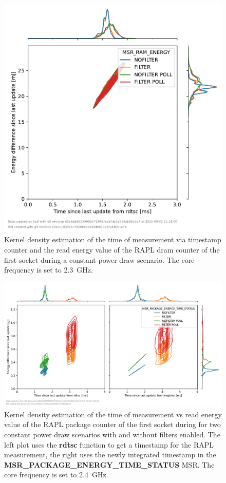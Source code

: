 \begin{figure}[]
    \centering
    \includegraphics[width=0.54\columnwidth]{fig/rapl-update-intervals/MSR_RAM_ENERGY_2300000.pdf}
    \caption{Kernel density estimation of the time of measurement via timestamp counter and the read energy value of the RAPL dram counter of the first socket during a constant power draw scenario.
    The core frequency is set to \SI{2.3}{\GHz}.}
\end{figure}

\clearpage
\begin{figure}[]
    \centering
    \includegraphics[width=\columnwidth]{fig/rapl-update-intervals/MSR_PACKAGE_ENERGY_TIME_STATUS_2400000.pdf}
    \caption{Kernel density estimation of the time of measurement vs read energy value of the RAPL package counter of the first socket during for two constant power draw scenarios with and without filters enabled.
    The left plot uses the \textbf{rdtsc} function to get a timestamp for the RAPL measurement, the right uses the newly integrated timestamp in the \textbf{MSR\_PACKAGE\_ENERGY\_TIME\_STATUS} MSR.
    The core frequency is set to \SI{2.4}{\GHz}.}
\end{figure}

